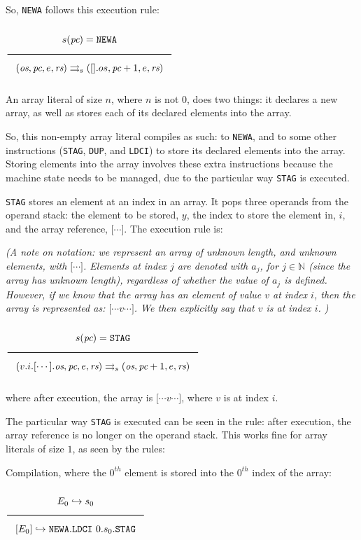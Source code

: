 So, \texttt{NEWA} follows this execution rule:

$\Rule{s(\textit{pc}) = \texttt{NEWA}}{
(\textit{os},\textit{pc},e,\textit{rs}) \transition
(\lbrack\rbrack.os,\textit{pc}+1,e,\textit{rs})}
$

An array literal of size $n$, where $n$ is not $0$, does two things: it declares a new array, as well as stores each of its declared elements into the array.

So, this non-empty array literal compiles as such: to \texttt{NEWA}, and to some other instructions (\texttt{STAG}, \texttt{DUP}, and \texttt{LDCI}) to store its declared elements into the array. Storing elements into the array involves these extra instructions because the machine state needs to be managed, due to the particular way \texttt{STAG} is executed.

\texttt{STAG} stores an element at an index in an array. It pops three operands from the operand stack: the element to be stored, $y$, the index to store the element in, $i$, and the array reference, $\lbrack\cdots\rbrack$. The execution rule is:

\textit{(A note on notation: we represent an array of unknown length, and unknown elements, with $\lbrack\cdots\rbrack$.
Elements at index $j$ are denoted with $a_j$, for $j \in \mathbb{N}$ (since the array has unknown length), regardless of whether the value of $a_j$ is defined.
However, if we know that the array has an element of value $v$ at index $i$, then the array is represented as: $\lbrack\cdots v \cdots\rbrack$. We then explicitly say that $v$ is at index $i$.
)}

$\Rule{s(\textit{pc}) = \texttt{STAG}}{
(v.i.\lbrack\cdots\rbrack.\textit{os},\textit{pc},e,\textit{rs}) \\
\transition (\textit{os},\textit{pc}+1,e,\textit{rs})}
$

where after execution, the array is $\lbrack\cdots v \cdots\rbrack$, where $v$ is at index $i$.

The particular way \texttt{STAG} is executed can be seen in the rule: after execution, the array reference is no longer on the operand stack.
This works fine for array literals of size $1$, as seen by the rules:

Compilation, where the $0^{th}$ element is stored into the $0^{th}$ index of the array:

$\Rule{E_0 \translateaux s_0}{
\lbrack E_0 \rbrack \translateaux \texttt{NEWA}
.\texttt{LDCI}\ 0.s_0.\texttt{STAG}}
$


